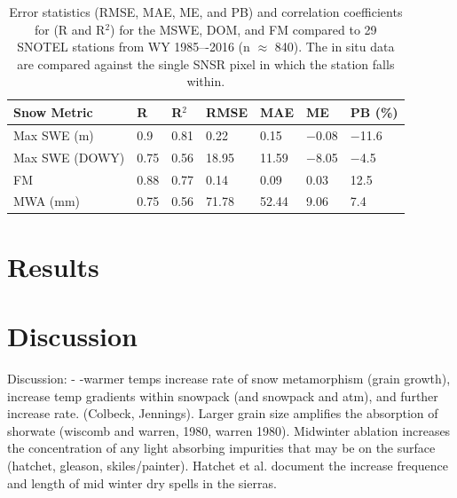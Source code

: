 \begin{table}[htbp]
  \centering
  \caption{Error statistics (RMSE, MAE, ME, and PB) and correlation coefficients for (R and R$^{2}$) for the MSWE, DOM, and FM compared to 29 SNOTEL stations from WY 1985–-2016 (n $\approx$ 840). The in situ data are compared against the single SNSR pixel in which the station falls within.}
  \label{tab:snow_metrics_val_table}
  \begin{tabular}{lllllll}
    \toprule
    Snow Metric & R & R$^{2}$ & RMSE & MAE & ME & PB (\%) \\
    \midrule
    Max SWE (m) & 0.9 & 0.81 & 0.22 & 0.15 & $-$0.08 & $-$11.6 \\
    Max SWE (DOWY) & 0.75 & 0.56 & 18.95 & 11.59 & $-$8.05 & $-$4.5 \\
    FM & 0.88 & 0.77 & 0.14 & 0.09 & 0.03 & 12.5 \\
    MWA (mm) & 0.75 & 0.56 & 71.78 & 52.44 & 9.06 & 7.4 \\
    \bottomrule
  \end{tabular}
\end{table}

\hypertarget{ch2-results}{\section{Results}\label{ch2-results}}



\hypertarget{ch2-discussion}{\section{Discussion}\label{ch2-discussion}}


Discussion:
-	-warmer temps increase rate of snow metamorphism (grain growth), increase temp gradients within snowpack (and snowpack and atm), and further increase rate. (Colbeck, Jennings). Larger grain size amplifies the absorption of shorwate (wiscomb and warren, 1980, warren 1980). Midwinter ablation increases the concentration of any light absorbing impurities that may be on the surface (hatchet, gleason, skiles/painter). Hatchet et al. document the increase frequence and length of mid winter dry spells in the sierras. 

